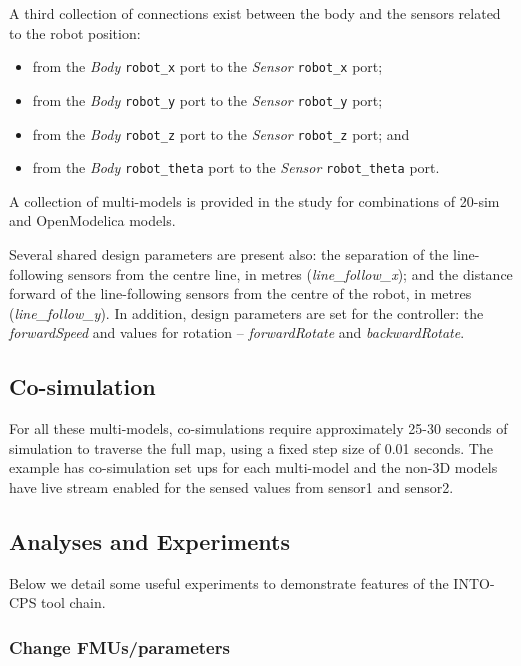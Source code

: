   
A third collection of connections exist between the body and the sensors related to the robot position:
 \begin{itemize}
  \item from the \emph{Body} \texttt{robot\_x} port to the \emph{Sensor} \texttt{robot\_x} port; 
  \item from the \emph{Body} \texttt{robot\_y} port to the \emph{Sensor} \texttt{robot\_y} port; 
  \item from the \emph{Body} \texttt{robot\_z} port to the \emph{Sensor} \texttt{robot\_z} port; and 
  \item from the \emph{Body} \texttt{robot\_theta} port to the \emph{Sensor} \texttt{robot\_theta} port. 
\end{itemize}
  
A collection of multi-models   is provided in the study for combinations of 20-sim and OpenModelica models.
  
Several shared design parameters are present also: the separation of the line-following sensors from the centre line, in metres (\emph{line\_follow\_x}); and the distance forward of the line-following sensors from the centre of the robot, in metres (\emph{line\_follow\_y}). In addition, design parameters are set for the controller: the \emph{forwardSpeed} and values for rotation -- \emph{forwardRotate} and \emph{backwardRotate}.
  

\subsection{Co-simulation}
\label{sec:fcu_into_co}

For all these multi-models, co-simulations require approximately 25-30 seconds of simulation to traverse the full map, using a fixed step size of 0.01 seconds. The example has co-simulation set ups for each multi-model and the non-3D models have live stream enabled for the sensed values from sensor1 and sensor2.

\subsection{Analyses and Experiments}
\label{sec:fcu_analyses}

Below we detail some useful experiments to demonstrate features of the INTO-CPS tool chain.

\subsubsection{Change FMUs/parameters}

